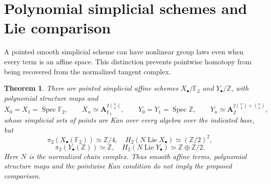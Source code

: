 \documentclass[11pt,a4paper]{article}
\newtheorem{theorem}{Theorem}[section]
\theoremstyle{definition}
\newcommand{\Spec}{\operatorname{Spec}}
\newcommand{\Z}{\mathbb Z}
\newcommand{\F}{\mathbb F}
\begin{document}
\section{Polynomial simplicial schemes and Lie comparison}\label{sec:lie}
A pointed smooth simplicial scheme can have nonlinear group laws even when every term is an affine space. This distinction prevents pointwise homotopy from being recovered from the normalized tangent complex.

\begin{theorem}\label{thm:lie}
There are pointed simplicial affine schemes $X_\bullet/\F_2$ and $Y_\bullet/\Z$, with polynomial structure maps and
\[
 X_0=X_1=\Spec\F_2,\qquad X_n\simeq\mathbf A^{2\binom n2}_{\F_2},
 \qquad
 Y_0=Y_1=\Spec\Z,\qquad
 Y_n\simeq\mathbf A^{2\binom n2+\binom n3}_{\Z},
\]
whose simplicial sets of points are Kan over every algebra over the indicated base, but
\[
 \pi_2(X_\bullet(\F_2))\simeq\Z/4,
 \quad H_2(N\operatorname{Lie}X_\bullet)\simeq(\Z/2)^2,
\]
\[
 \pi_2(Y_\bullet(\Z))\simeq\Z,
 \quad H_2(N\operatorname{Lie}Y_\bullet)\simeq\Z\oplus\Z/2.
\]
Here $N$ is the normalized chain complex. Thus smooth affine terms, polynomial structure maps and the pointwise Kan condition do not imply the proposed comparison.
\end{theorem}
\end{document}
